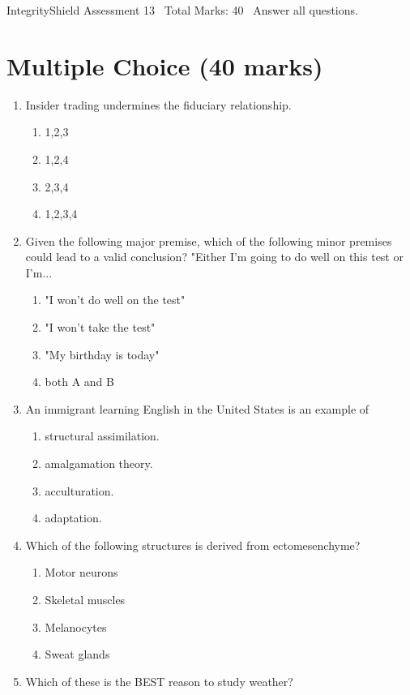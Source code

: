\documentclass[12pt]{article}
\begin{document}
\begin{center}
IntegrityShield Assessment 13 \
Total Marks: 40 \
Answer all questions.
\end{center}

\section*{Multiple Choice (40 marks)}
\begin{enumerate}[label=\arabic*.]
\item Insider trading undermines the fiduciary relationship.
\begin{enumerate}[label=(\alph*)]
    \item 1,2,3
    \item 1,2,4
    \item 2,3,4
    \item 1,2,3,4
\end{enumerate}
\item Given the following major premise, which of the following minor premises could lead to a valid conclusion? "Either I'm going to do well on this test or I'm...
\begin{enumerate}[label=(\alph*)]
    \item "I won't do well on the test"
    \item "I won't take the test"
    \item "My birthday is today"
    \item both A and B
\end{enumerate}
\item An immigrant learning English in the United States is an example of
\begin{enumerate}[label=(\alph*)]
    \item structural assimilation.
    \item amalgamation theory.
    \item acculturation.
    \item adaptation.
\end{enumerate}
\item Which of the following structures is derived from ectomesenchyme?
\begin{enumerate}[label=(\alph*)]
    \item Motor neurons
    \item Skeletal muscles
    \item Melanocytes
    \item Sweat glands
\end{enumerate}
\item Which of these is the BEST reason to study weather?

\end{enumerate}
\end{document}
